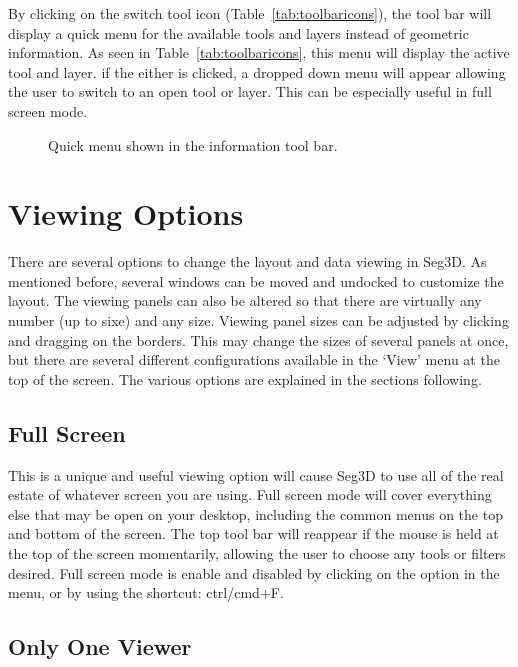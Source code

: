 \documentclass[fleqn,11pt,openany]{book}
\begin{document}
By clicking on the switch tool icon (Table~\ref{tab:toolbaricons}), the tool bar will display a quick menu for the available tools and layers instead of geometric information.  As seen in Table~\ref{tab:toolbaricons}, this menu will display the active tool and layer.  if the either is clicked, a dropped down menu will appear allowing the user to switch to an open tool or layer.  This can be especially useful in full screen mode.  

\begin{figure}[h!]
\caption{Quick menu shown in the information tool bar.}\label{fig:quickmenu}
\end{figure}


\section{Viewing Options}
\label{sec:viewing}

There are several options to change the layout and data viewing in Seg3D.  As mentioned before, several windows can be moved and undocked to customize the layout.  The viewing panels can also be altered so that there are virtually any number (up to sixe) and any size.  Viewing panel sizes can be adjusted by clicking and dragging on the borders.  This may change the sizes of several panels at once, but there are several different configurations available in the `View' menu at the top of the screen.  The various options are explained in the sections following.  

\subsection{Full Screen}

This is a unique and useful viewing option will cause Seg3D to use all of the real estate of whatever screen you are using.  Full screen mode will cover everything else that may be open on your desktop, including the common menus on the top and bottom of the screen.  The top tool bar will reappear if the mouse is held at the top of the screen momentarily, allowing the user to choose any tools or filters desired.  Full screen mode is enable and disabled by clicking on the option in the menu, or by using the shortcut: ctrl/cmd+F.  

\subsection{Only One Viewer}
\end{document}
